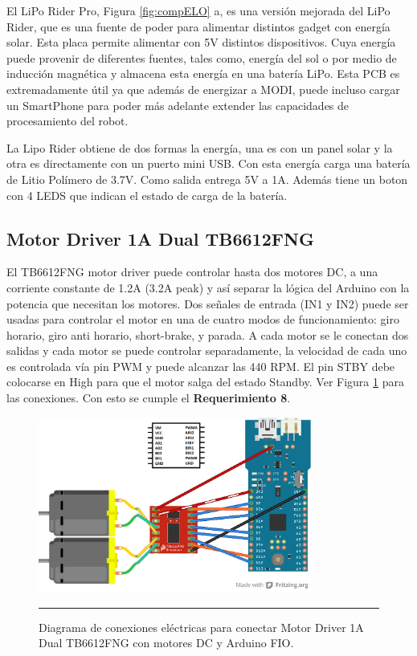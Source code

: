 El LiPo Rider Pro, Figura \ref{fig:compELO} a, es una versión mejorada del LiPo Rider, que es una fuente de poder para alimentar distintos gadget con energía solar. Esta placa permite alimentar con 5V distintos dispositivos. Cuya energía puede provenir de diferentes fuentes, tales como, energía del sol o por medio de inducción magnética y almacena esta energía en una batería LiPo. Esta PCB es extremadamente útil ya que además de energizar a MODI, puede incluso cargar un SmartPhone para poder más adelante extender las capacidades de procesamiento del robot.

La Lipo Rider obtiene de dos formas la energía, una es con un panel solar y la otra es directamente con un puerto mini USB. Con esta energía carga una batería de Litio Polímero de 3.7V. Como salida entrega 5V a 1A. Además tiene un boton con 4 LEDS que indican el estado de carga de la batería.

\subsection{Motor Driver 1A Dual TB6612FNG}
El TB6612FNG motor driver puede controlar hasta dos motores DC, a una corriente constante de 1.2A (3.2A peak) y así separar la lógica del Arduino con la potencia que necesitan los motores. Dos señales de entrada (IN1 y IN2) puede ser usadas para controlar el motor en una de cuatro modos de funcionamiento: giro horario, giro anti horario, short-brake, y parada. A cada motor se le conectan dos salidas y cada motor se puede controlar separadamente, la velocidad de cada uno es controlada vía pin PWM y puede alcanzar las 440 RPM. El pin STBY debe colocarse en High para que el motor salga del estado Standby. Ver Figura  \ref{fig:TB6612FNG} para las conexiones. Con esto se cumple el \textbf{Requerimiento 8}.

\begin{figure}[htbp]
	\centering
		\includegraphics[width=0.8\textwidth]{./Figures/MODI/MODI_without_LED_bb.png}
		\rule{35em}{0.5pt}
	\caption[Conexión eléctrica Motor Driver 1A Dual TB6612FNG]{Diagrama de conexiones eléctricas para conectar Motor Driver 1A Dual TB6612FNG con motores DC y Arduino FIO.}
	\label{fig:TB6612FNG}
\end{figure}

